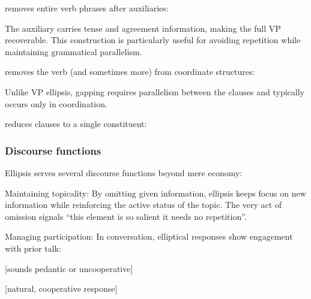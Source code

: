  removes entire verb phrases after auxiliaries:

\ea
{}
\z
\z
The auxiliary carries tense and agreement information, making the full VP recoverable. This construction is particularly useful for avoiding repetition while maintaining grammatical parallelism.

 removes the verb (and sometimes more) from coordinate structures:

\z
{}

Unlike VP ellipsis, gapping requires parallelism between the clauses and typically occurs only in coordination.

 reduces clauses to a single constituent:

\ea
{}
\z
\z
{}

\subsubsection*{Discourse functions}

Ellipsis serves several discourse functions beyond mere economy:

Maintaining topicality: By omitting given information, ellipsis keeps focus on new information while reinforcing the active status of the topic. The very act of omission signals \enquote{this element is so salient it needs no repetition}.

Managing participation: In conversation, elliptical responses show engagement with prior talk:

\begin{dialogue}
\item[A] 
\item[B1]  \hfill [sounds pedantic or uncooperative]
\item[B2]  \hfill [natural, cooperative response]
\end{dialogue}

